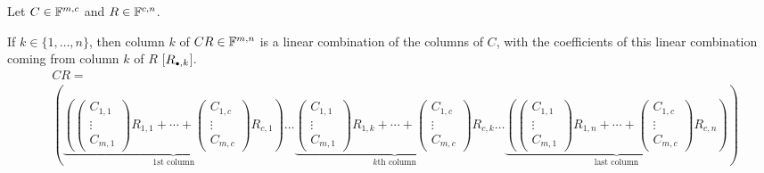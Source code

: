 \begin{thm}
  \phantom{.} Let $C\in\mathbb{F}^{m,c}$ and $R\in\mathbb{F}^{c,n}$.

   If $k \in \{1,\ldots,n\}$, then column $k$ of $CR\in \mathbb{F}^{m,n}$ is a linear combination of the columns of $C$, with the coefficients of this linear combination coming from column $k$ of $R$ [$R_{\mathsmaller{\bullet}, k}$].
  \begin{equation}
    \begin{aligned}
      &CR = \\
      &\left(
      \underbrace{
      \left(
       \left(
          \begin{matrix}C_{1,1}
            \\ \vdots \\ C_{m,1}
          \end{matrix}
        \right) R_{1,1}
        + \cdots +
        \left(
          \begin{matrix}C_{1,c}
            \\ \vdots \\ C_{m,c}
          \end{matrix}
        \right) R_{c,1}
        \right)
      }_{\text{$1$st column}}
      \ldots
      \underbrace{
        \boxed{
          \left(
            \begin{matrix}C_{1,1}
              \\ \vdots \\ C_{m,1}
            \end{matrix}
          \right) R_{1,k}
          + \cdots +
          \left(
            \begin{matrix}C_{1,c}
              \\ \vdots \\ C_{m,c}
            \end{matrix}
          \right) R_{c,k}
        }
      }_{\text{$k$th column}}
      \ldots
      \underbrace{
        \left(
          \left(
            \begin{matrix}C_{1,1}
              \\ \vdots \\ C_{m,1}
            \end{matrix}
          \right) R_{1,n}
          + \cdots +
          \left(
            \begin{matrix}C_{1,c}
              \\ \vdots \\ C_{m,c}
            \end{matrix}
          \right) R_{c,n}
        \right)
      }_{\text{last column}}
      \right)
    \end{aligned}
  \end{equation}


\end{thm}
